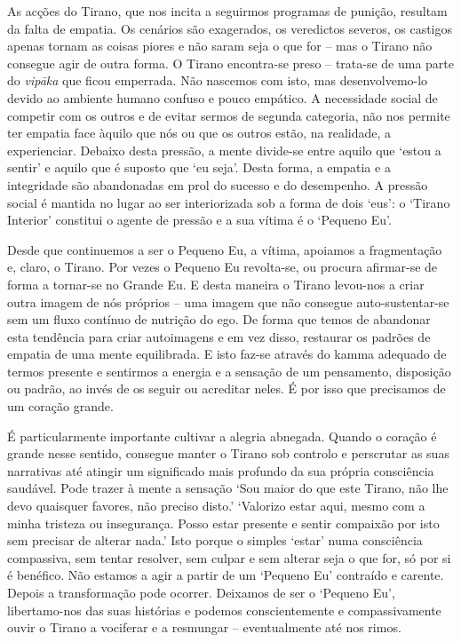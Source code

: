 As acções do Tirano, que nos incita a seguirmos programas de punição, resultam da falta de empatia. Os cenários são exagerados, os veredictos severos, os castigos apenas tornam as coisas piores e não saram seja o que for -- mas o Tirano não consegue agir de outra forma. O Tirano encontra-se preso -- trata-se de uma parte do \emph{vipāka} que ficou emperrada. Não nascemos com isto, mas desenvolvemo-lo devido ao ambiente humano confuso e pouco empático. A necessidade social de competir com os outros e de evitar sermos de segunda categoria, não nos permite ter empatia face àquilo que nós ou que os outros estão, na realidade, a experienciar. Debaixo desta pressão, a mente divide-se entre aquilo que `estou a sentir' e aquilo que é suposto que `eu seja'. Desta forma, a empatia e a integridade são abandonadas em prol do sucesso e do desempenho. A pressão social é mantida no lugar ao ser interiorizada sob a forma de dois `eus': o `Tirano Interior' constitui o agente de pressão e a sua vítima é o `Pequeno Eu'.

Desde que continuemos a ser o Pequeno Eu, a vítima, apoiamos a fragmentação e, claro, o Tirano. Por vezes o Pequeno Eu revolta-se, ou procura afirmar-se de forma a tornar-se no Grande Eu. E desta maneira o Tirano levou-nos a criar outra imagem de nós próprios -- uma imagem que não consegue auto-sustentar-se sem um fluxo contínuo de nutrição do ego. De forma que temos de abandonar esta tendência para criar autoimagens e em vez disso, restaurar os padrões de empatia de uma mente equilibrada. E isto faz-se através do kamma adequado de termos presente e sentirmos a energia e a sensação de um pensamento, disposição ou padrão, ao invés de os seguir ou acreditar neles. É por isso que precisamos de um coração grande.

É particularmente importante cultivar a alegria abnegada. Quando o coração é grande nesse sentido, consegue manter o Tirano sob controlo e perscrutar as suas narrativas até atingir um significado mais profundo da sua própria consciência saudável. Pode trazer à mente a sensação `Sou maior do que este Tirano, não lhe devo quaisquer favores, não preciso disto.' `Valorizo estar aqui, mesmo com a minha tristeza ou insegurança. Posso estar presente e sentir compaixão por isto sem precisar de alterar nada.' Isto porque o simples `estar' numa consciência compassiva, sem tentar resolver, sem culpar e sem alterar seja o que for, só por si é benéfico. Não estamos a agir a partir de um `Pequeno Eu' contraído e carente. Depois a transformação pode ocorrer. Deixamos de ser o `Pequeno Eu', libertamo-nos das suas histórias e podemos conscientemente e compassivamente ouvir o Tirano a vociferar e a resmungar -- eventualmente até nos rimos.

